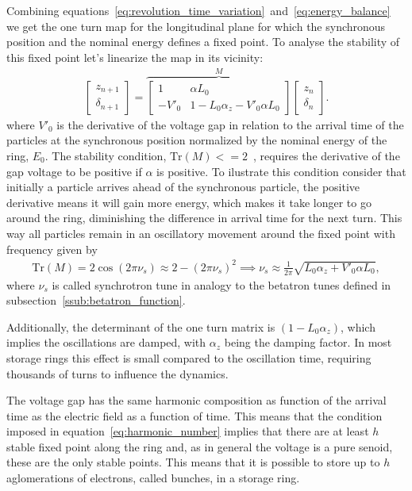 	Combining equations~\eqref{eq:revolution_time_variation}~and~\eqref{eq:energy_balance} we get the one turn map for the longitudinal plane for which the synchronous position and the nominal energy defines a fixed point. To analyse the stability of this fixed point let's linearize the map in its vicinity:
	\begin{align}\label{eq:longitudinal_linear_map}
		\begin{bmatrix} z_{n+1} \\ \delta_{n+1}\end{bmatrix} = \overbrace{
			\begin{bmatrix}
                1 & \alpha L_0 \\
                -V'_0 & 1-L_0\alpha_z - V'_0\alpha L_0
            \end{bmatrix}
		}^M \begin{bmatrix} z_n \\ \delta_n \end{bmatrix}.
	\end{align}
	where $V'_0$ is the derivative of the voltage gap in relation to the arrival time of the particles at the synchronous position normalized by the nominal energy of the ring, $E_0$. The stability condition, $\text{Tr}(M) <= 2$~\cite[pp. 123]{LeeBook}, requires the derivative of the gap voltage to be positive if $\alpha$ is positive. To ilustrate this condition consider that initially a particle arrives ahead of the synchronous particle, the positive derivative means it will gain more energy, which makes it take longer to go around the ring, diminishing the difference in arrival time for the next turn. This way all particles remain in an oscillatory movement around the fixed point with frequency given by
	\begin{align}
		\text{Tr}(M) = 2\cos(2\pi\nu_s) \approx 2-(2\pi\nu_s)^2 \implies
		\nu_s \approx \frac{1}{2\pi}\sqrt{L_0\alpha_z+V'_0\alpha L_0},
	\end{align}
	where $\nu_s$ is called synchrotron tune in analogy to the betatron tunes defined in subsection~\ref{ssub:betatron_function}.

	Additionally, the determinant of the one turn matrix is $(1-L_0\alpha_z)$, which implies the oscillations are damped, with $\alpha_z$ being the damping factor. In most storage rings this effect is small compared to the oscillation time, requiring thousands of turns to influence the dynamics.

	The voltage gap has the same harmonic composition as function of the arrival time as the electric field as a function of time. This means that the condition imposed in equation~\eqref{eq:harmonic_number} implies that there are at least $h$ stable fixed point along the ring and, as in general the voltage is a pure senoid, these are the only stable points. This means that it is possible to store up to $h$ aglomerations of electrons, called bunches, in a storage ring.

